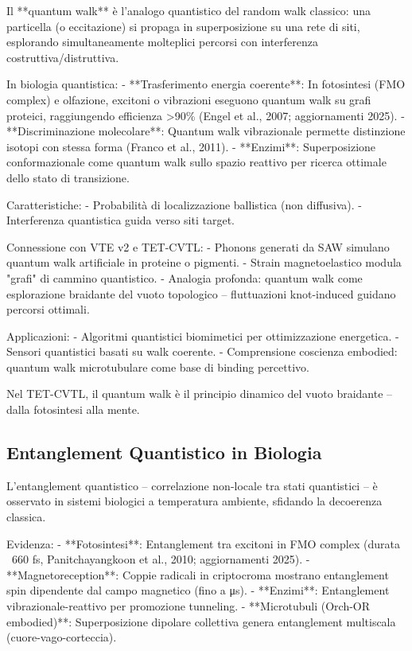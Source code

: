 \documentclass[11pt,a4paper]{article}
\begin{document}
Il **quantum walk** è l'analogo quantistico del random walk classico: una particella (o eccitazione) si propaga in superposizione su una rete di siti, esplorando simultaneamente molteplici percorsi con interferenza costruttiva/distruttiva.

In biologia quantistica:
- **Trasferimento energia coerente**: In fotosintesi (FMO complex) e olfazione, excitoni o vibrazioni eseguono quantum walk su grafi proteici, raggiungendo efficienza >90\% (Engel et al., 2007; aggiornamenti 2025).
- **Discriminazione molecolare**: Quantum walk vibrazionale permette distinzione isotopi con stessa forma (Franco et al., 2011).
- **Enzimi**: Superposizione conformazionale come quantum walk sullo spazio reattivo per ricerca ottimale dello stato di transizione.

Caratteristiche:
- Probabilità di localizzazione ballistica (non diffusiva).
- Interferenza quantistica guida verso siti target.

Connessione con VTE v2 e TET-CVTL:
- Phonons generati da SAW simulano quantum walk artificiale in proteine o pigmenti.
- Strain magnetoelastico modula "grafi" di cammino quantistico.
- Analogia profonda: quantum walk come esplorazione braidante del vuoto topologico – fluttuazioni knot-induced guidano percorsi ottimali.

Applicazioni:
- Algoritmi quantistici biomimetici per ottimizzazione energetica.
- Sensori quantistici basati su walk coerente.
- Comprensione coscienza embodied: quantum walk microtubulare come base di binding percettivo.

Nel TET-CVTL, il quantum walk è il principio dinamico del vuoto braidante – dalla fotosintesi alla mente.

\subsection{Entanglement Quantistico in Biologia}

L'entanglement quantistico – correlazione non-locale tra stati quantistici – è osservato in sistemi biologici a temperatura ambiente, sfidando la decoerenza classica.

Evidenza:
- **Fotosintesi**: Entanglement tra excitoni in FMO complex (durata ~660 fs, Panitchayangkoon et al., 2010; aggiornamenti 2025).
- **Magnetoreception**: Coppie radicali in criptocroma mostrano entanglement spin dipendente dal campo magnetico (fino a μs).
- **Enzimi**: Entanglement vibrazionale-reattivo per promozione tunneling.
- **Microtubuli (Orch-OR embodied)**: Superposizione dipolare collettiva genera entanglement multiscala (cuore-vago-corteccia).
\end{document}
